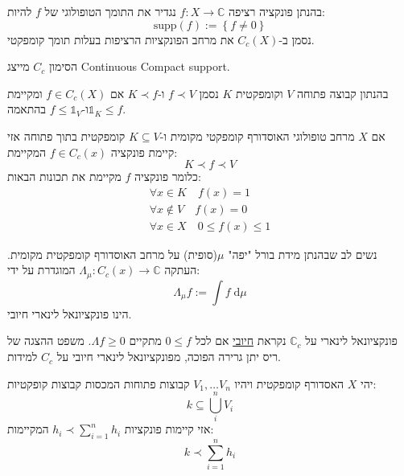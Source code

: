 \documentclass{tstextbook}
\begin{document}
\begin{definition}
בהנתן פונקציה רציפה \(f:X\to \mathbb{C}\) נגדיר את התומך הטופולוגי של \(f\) להיות:
$$\mathrm{supp}(f):= \left\{  f\neq 0  \right\}$$
נסמן ב-\(C_{c}(X)\) את מרחב הפונקציות הרציפות בעלות תומך קומפקטי.

\end{definition}
\begin{remark}
הסימון \(C_{c}\) מייצג Continuous Compact support.

\end{remark}
\begin{symbolize}
בהנתון קבוצה פתוחה \(V\) וקומפקטית \(K\) נסמן \(f \prec V\) ו-\(K\prec f\) אם \(f \in C_{c}(X)\) ומקיימת \(\mathbb{1}_{K} \leq f\)ו-\(f\leq \mathbb{1} _{V}\) בהתאמה.

\end{symbolize}
\begin{theorem}
אם \(X\) מרחב טופולוגי האוסדורף קומפקטי מקומית ו-\(K\subseteq V\) קומפקטית בתוך פתוחה אזי קיימת פונקציה \(f\in C_{c}(x)\) המקיימת:
$$K \prec f \prec V$$
כלומר פונקציה \(f\) מקיימת את תכונות הבאות:
\begin{gather*}\forall x \in K \quad f(x)=1\\ \forall x \not  \in V \quad  f(x) = 0 \\ \forall x \in X \quad 0\leq f(x)\leq 1 
\end{gather*}

\end{theorem}
\begin{remark}
נשים לב שבהנתן מידת בורל "יפה" \(\mu\)(סופית) על מרחב האוסדורף קומפקטית מקומית. העתקה \(\Lambda_{\mu}:C_{c}(x)\to \mathbb{C}\) המוגדרת על ידי:
$$\Lambda_{\mu}f := \int f \;\mathrm{d} \mu $$
הינו פונקציונאל לינארי חיובי.

\end{remark}
\begin{definition}
פונקציונאל לינארי על \(\mathbb{C}_{c}\) נקראת \underline{חיובי} אם לכל \(0\leq f\) מתקיים \(\Lambda f \geq 0\). משפט ההצגה של ריס יתן גרירה הפוכה, מפונקציונאל לינארי חיובי על \(C_{c}\) למידות.

\end{definition}
\begin{lemma}
יהי \(X\) האסדורף קומפקטית ויהיו \(V_{1},\dots V_{n}\) קבוצות פתוחות המכסות קבוצות קופקטיות:
$$k\subseteq \bigcup_{i}^{n} V_{i}$$
אזי קיימות פונקציות \(h_{i}\prec \sum_{i=1}^{n}h_{i}\) המקיימות:
$$k\prec \sum_{i=1}^{n} h_{i}$$

\end{lemma}
\end{document}
